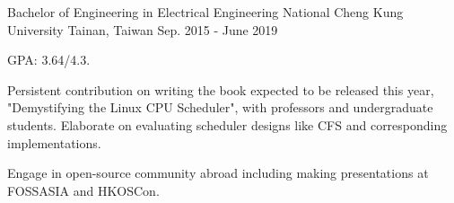 \begin{cventries}
  \vspace{-3mm}

  \cventry
    {Bachelor of Engineering in Electrical Engineering} %
    {National Cheng Kung University} %
    {Tainan, Taiwan} %
    {Sep. 2015 - June 2019} %
    {
      \begin{cvitems} %
        \item{GPA: 3.64/4.3.}
        \item {Persistent contribution on writing the book expected to be released this year, "Demystifying the Linux CPU Scheduler", with professors and undergraduate students. Elaborate on 
        evaluating scheduler designs like CFS and corresponding implementations.
        }
        \item{Engage in open-source community abroad including making presentations at FOSSASIA and HKOSCon.
        }
      \end{cvitems}
    }

\end{cventries}
